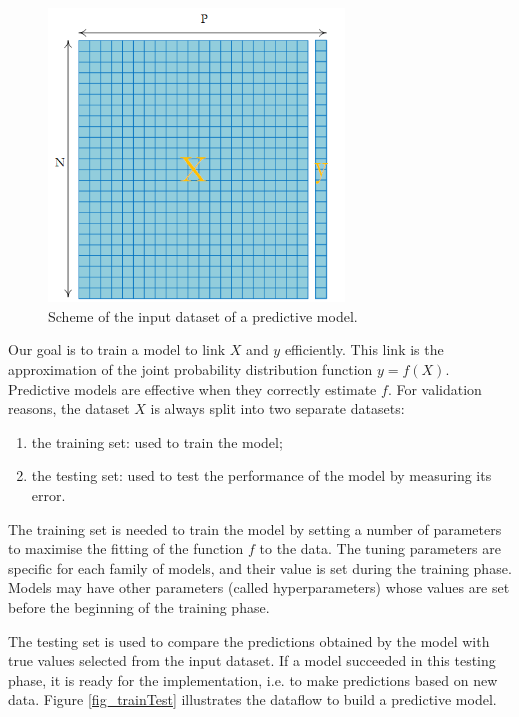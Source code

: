 \begin{figure}[hbt!]
\centering
\includegraphics[width=0.7\textwidth]{SectionLetsMath/linearRegression_figures/fig_learningTable.png}
\captionsetup{type=figure}
\caption{Scheme of the input dataset of a predictive model.}
\label{fig_learningTable}
\end{figure}

Our goal is to train a model to link $X$ and $y$ efficiently. This link is the approximation of the joint probability distribution function $y=f(X)$. Predictive models are effective when they correctly estimate $f$. For validation reasons, the dataset $X$ is always split into two separate datasets:
\begin{enumerate}
    \item the training set: used to train the model;
    \item the testing set: used to test the performance of the model by measuring its error.
\end{enumerate}

The training set is needed to train the model by setting a number of parameters to maximise the fitting of the function $f$ to the data. The tuning parameters are specific for each family of models, and their value is set during the training phase. Models may have other parameters (called hyperparameters) whose values are set before the beginning of the training phase. \par
The testing set is used to compare the predictions obtained by the model with true values selected from the input dataset. If a model succeeded in this testing phase, it is ready for the implementation, i.e. to make predictions based on new data. Figure \ref{fig_trainTest} illustrates the dataflow to build a predictive model.

